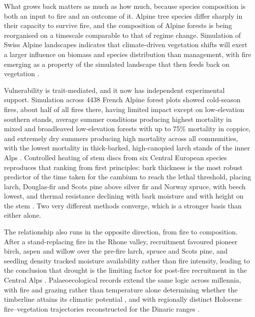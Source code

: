 \documentclass[11pt,a4paper]{article}
\begin{document}
What grows back matters as much as how much, because species composition is both an input to fire and an outcome of it. Alpine tree species differ sharply in their capacity to survive fire, and the composition of Alpine forests is being reorganised on a timescale comparable to that of regime change. Simulation of Swiss Alpine landscapes indicates that climate-driven vegetation shifts will exert a larger influence on biomass and species distribution than management, with fire emerging as a property of the simulated landscape that then feeds back on vegetation \citep{schumacher_relative_2006}.

Vulnerability is trait-mediated, and it now has independent experimental support. Simulation across 4438 French Alpine forest plots showed cold-season fires, about half of all fires there, having limited impact except on low-elevation southern stands, average summer conditions producing highest mortality in mixed and broadleaved low-elevation forests with up to 75\% mortality in coppice, and extremely dry summers producing high mortality across all communities, with the lowest mortality in thick-barked, high-canopied larch stands of the inner Alps \citep{dupire_vulnerability_2019}. Controlled heating of stem discs from six Central European species reproduces that ranking from first principles: bark thickness is the most robust predictor of the time taken for the cambium to reach the lethal threshold, placing larch, Douglas-fir and Scots pine above silver fir and Norway spruce, with beech lowest, and thermal resistance declining with bark moisture and with height on the stem \citep{mutterer_bark_2026}. Two very different methods converge, which is a stronger basis than either alone.

The relationship also runs in the opposite direction, from fire to composition. After a stand-replacing fire in the Rhone valley, recruitment favoured pioneer birch, aspen and willow over the pre-fire larch, spruce and Scots pine, and seedling density tracked moisture availability rather than fire intensity, leading to the conclusion that drought is the limiting factor for post-fire recruitment in the Central Alps \citep{moser_potential_2010}. Palaeoecological records extend the same logic across millennia, with fire and grazing rather than temperature alone determining whether the timberline attains its climatic potential \citep{colombaroli_species_2010}, and with regionally distinct Holocene fire--vegetation trajectories reconstructed for the Dinaric ranges \citep{cagliero_effect_nodate}.
\end{document}
